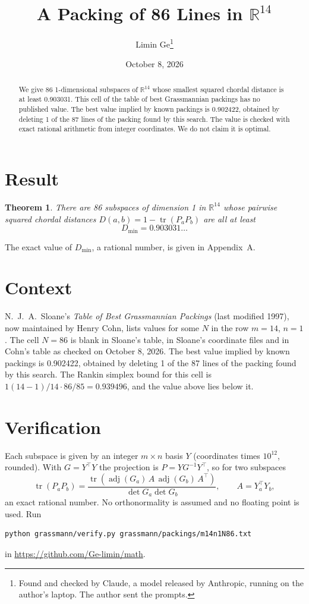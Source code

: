 \documentclass[11pt,a4paper]{article}
\title{A Packing of 86 Lines in $\mathbb{R}^{14}$}
\author{Limin Ge\thanks{Found and checked by Claude, a model released by Anthropic, running on the author's laptop. The author sent the prompts.}}
\date{October 8, 2026}
\newtheorem*{theorem}{Theorem}
\begin{document}
\maketitle
\begin{abstract}
We give 86 1-dimensional subspaces of $\mathbb{R}^{14}$ whose smallest squared chordal distance is at least 0.903031. This cell of the table of best Grassmannian packings has no published value. The best value implied by known packings is 0.902422, obtained by deleting 1 of the 87 lines of the packing found by this search. The value is checked with exact rational arithmetic from integer coordinates. We do not claim it is optimal.
\end{abstract}

\section{Result}
\begin{theorem}
There are 86 subspaces of dimension 1 in $\mathbb{R}^{14}$ whose pairwise squared chordal distances $D(a,b) = 1 - \operatorname{tr}(P_aP_b)$ are all at least
\[ D_{\min} = 0.903031\ldots \]
\end{theorem}
The exact value of $D_{\min}$, a rational number, is given in Appendix~A.


\section{Context}
N.~J.~A.~Sloane's \emph{Table of Best Grassmannian Packings} (last modified 1997), now maintained by Henry Cohn, lists values for some $N$ in the row $m=14$, $n=1$. The cell $N=86$ is blank in Sloane's table, in Sloane's coordinate files and in Cohn's table as checked on October 8, 2026. The best value implied by known packings is 0.902422, obtained by deleting 1 of the 87 lines of the packing found by this search. The Rankin simplex bound for this cell is $1(14-1)/14\cdot 86/85 = 0.939496$, and the value above lies below it.


\section{Verification}
Each subspace is given by an integer $m\times n$ basis $Y$ (coordinates times $10^{12}$, rounded). With $G=Y^\top Y$ the projection is $P=YG^{-1}Y^\top$, so for two subspaces
\[ \operatorname{tr}(P_aP_b)=\frac{\operatorname{tr}(\operatorname{adj}(G_a)\,A\,\operatorname{adj}(G_b)\,A^\top)}{\det G_a\det G_b},\qquad A=Y_a^\top Y_b, \]
an exact rational number. No orthonormality is assumed and no floating point is used. Run
\begin{verbatim}
python grassmann/verify.py grassmann/packings/m14n1N86.txt
\end{verbatim}
in \url{https://github.com/Ge-limin/math}.
\end{document}
